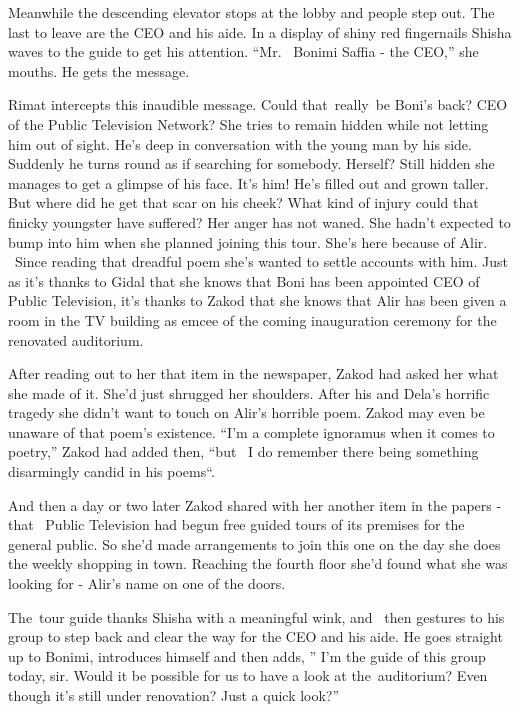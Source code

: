 \documentclass[twoside,11pt]{book}
\begin{document}
Meanwhile the descending elevator stops at the lobby and people step out. The last to leave are the CEO and his aide. In
a display of shiny red fingernails Shisha waves to the guide to get his attention. ``Mr. ~Bonimi Saffia -
the CEO,'' she mouths. He gets the message.

Rimat intercepts this inaudible message. Could that~really~be Boni's back? CEO of the Public Television Network? She
tries to remain hidden while not letting him out of sight. He's deep in conversation with the young man by his side.
Suddenly he turns round as if searching for somebody. Herself? Still hidden she manages to get a glimpse of his face.
It's him! He's filled out and grown taller. But where did he get that scar on his cheek? What kind of injury could that
finicky youngster have suffered? Her anger has not waned. She hadn't expected to bump into him when she planned joining
this tour{.} She's here because of Alir. \ Since reading that dreadful
poem she's wanted to settle accounts with him. Just as it's thanks to Gidal that she knows that Boni has been appointed
CEO of Public Television, it's thanks to Zakod that she knows that Alir has been given a room in the TV building as
emcee of the{
}coming{ }inauguration ceremony for the renovated auditorium.

After reading out to her that item in the newspaper, Zakod had asked her what she made of it. She'd just shrugged her
shoulders. After his and Dela's horrific tragedy she didn't want to touch on Alir's horrible poem. Zakod may even be
unaware of that poem's existence. ``I'm a complete ignoramus when it comes to poetry,'' Zakod
had added then, ``but ~I do remember there being something disarmingly candid in his poems``.


And then a day or two later Zakod shared with her another item in the papers - that ~Public Television had begun free
guided tours of its premises for the general public. So she'd made arrangements to join this one on the day she does
the weekly shopping in town. Reaching the fourth floor she'd found what she was looking for - Alir's name on one of the
doors.

The~tour guide thanks Shisha with a meaningful wink, and \ then gestures to his group to step back and clear the way for
the CEO and his aide. He goes straight up to Bonimi, introduces himself and then adds, '' I'm the guide of
this group today, sir. Would it be possible for us to have a look at the~auditorium? Even though it's still under
renovation? Just a quick look?''
\end{document}

